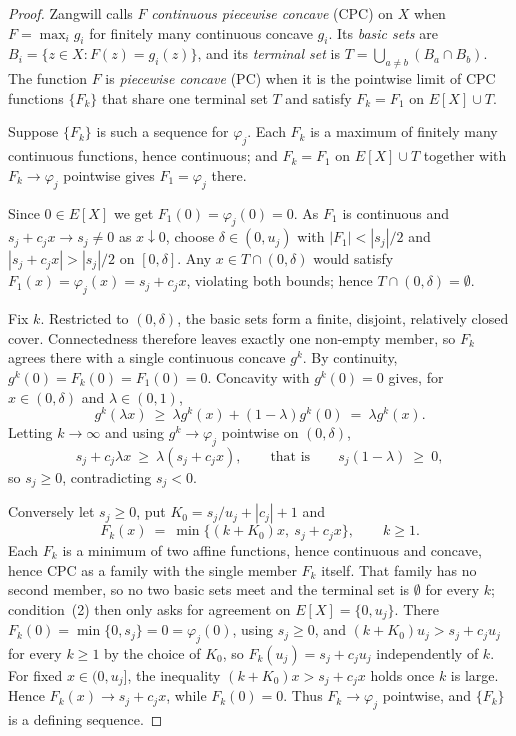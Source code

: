 \documentclass[review,11pt]{elsarticle}
\theoremstyle{remark}
\theoremstyle{definition}
\begin{document}
\begin{proof}
Zangwill calls $F$ \emph{continuous piecewise concave} (CPC) on $X$ when
$F=\max_i g_i$ for finitely many continuous concave $g_i$. Its \emph{basic sets} are
$B_i=\{z\in X: F(z)=g_i(z)\}$, and its \emph{terminal set} is
$T=\bigcup_{a\ne b}(B_a\cap B_b)$. The function $F$ is \emph{piecewise concave} (PC) when it is the pointwise limit of CPC functions
$\{F_k\}$ that share one terminal set $T$ and satisfy $F_k=F_1$ on $E[X]\cup T$.

Suppose $\{F_k\}$ is such a sequence for $\varphi_j$. Each $F_k$ is a maximum of finitely
many continuous functions, hence continuous; and $F_k=F_1$ on $E[X]\cup T$ together with
$F_k\to\varphi_j$ pointwise gives $F_1=\varphi_j$ there.

Since $0\in E[X]$ we get $F_1(0)=\varphi_j(0)=0$. As $F_1$ is continuous and
$s_j+c_jx\to s_j\ne0$ as $x\downarrow0$, choose $\delta\in(0,u_j)$ with $|F_1|<|s_j|/2$ and
$|s_j+c_jx|>|s_j|/2$ on $[0,\delta]$. Any $x\in T\cap(0,\delta)$ would satisfy
$F_1(x)=\varphi_j(x)=s_j+c_jx$, violating both bounds; hence $T\cap(0,\delta)=\emptyset$.

Fix $k$. Restricted to $(0,\delta)$, the basic sets form a finite, disjoint, relatively
closed cover. Connectedness therefore leaves exactly one non-empty member, so $F_k$
agrees there with a single continuous concave $g^k$. By continuity,
$g^k(0)=F_k(0)=F_1(0)=0$. Concavity with $g^k(0)=0$ gives, for $x\in(0,\delta)$ and
$\lambda\in(0,1)$,
\[
g^k(\lambda x)\ \ge\ \lambda g^k(x)+(1-\lambda)g^k(0)\ =\ \lambda g^k(x).
\]
Letting $k\to\infty$ and using $g^k\to\varphi_j$ pointwise on $(0,\delta)$,
\[
s_j+c_j\lambda x\ \ge\ \lambda(s_j+c_jx),\qquad\text{that is}\qquad s_j(1-\lambda)\ \ge\ 0 ,
\]
so $s_j\ge0$, contradicting $s_j<0$.

Conversely let $s_j\ge0$, put $K_0=s_j/u_j+|c_j|+1$ and
\[
F_k(x)\ =\ \min\bigl\{(k+K_0)x,\ s_j+c_jx\bigr\},\qquad k\ge1 .
\]
Each $F_k$ is a minimum of two affine functions, hence continuous and concave, hence CPC as
a family with the single member $F_k$ itself. That family has no second member, so no two
basic sets meet and the terminal set is $\emptyset$ for every $k$; condition~(2) then only
asks for agreement on $E[X]=\{0,u_j\}$. There $F_k(0)=\min\{0,s_j\}=0=\varphi_j(0)$, using
$s_j\ge0$, and $(k+K_0)u_j>s_j+c_ju_j$ for every $k\ge1$ by the choice of $K_0$, so
$F_k(u_j)=s_j+c_ju_j$ independently of $k$. For fixed $x\in(0,u_j]$, the inequality
$(k+K_0)x>s_j+c_jx$ holds once $k$ is large. Hence $F_k(x)\to s_j+c_jx$, while
$F_k(0)=0$. Thus $F_k\to\varphi_j$ pointwise, and $\{F_k\}$ is a defining sequence.
\end{proof}
\end{document}
